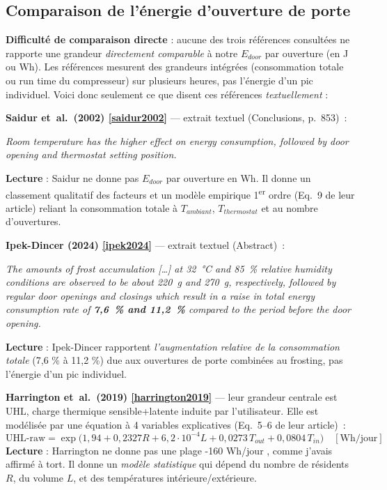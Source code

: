\documentclass[11pt,a4paper]{article}
\begin{document}
\subsection{Comparaison de l'énergie d'ouverture de porte}

\begin{honnete}
\textbf{Difficulté de comparaison directe} : aucune des trois références consultées ne
rapporte une grandeur \emph{directement comparable} à notre $E_{door}$ par ouverture (en
J ou Wh). Les références mesurent des grandeurs intégrées (consommation totale ou run
time du compresseur) sur plusieurs heures, pas l'énergie d'un pic individuel. Voici donc
seulement ce que disent ces références \emph{textuellement} :
\end{honnete}

\textbf{Saidur et~al.\ (2002) \ref{saidur2002}} — extrait textuel (Conclusions, p.~853)~:
\begin{tcolorbox}[breakable,enhanced jigsaw,colback=yellow!10,colframe=yellow!50!black,boxrule=0.4pt,arc=2pt]
\og{} \emph{Room temperature has the higher effect on energy consumption, followed by
door opening and thermostat setting position.} \fg{}
\end{tcolorbox}
\textbf{Lecture} : Saidur ne donne pas $E_{door}$ par ouverture en Wh. Il donne un classement
qualitatif des facteurs et un modèle empirique 1\textsuperscript{er} ordre (Eq.~9 de leur
article) reliant la consommation totale à $T_{ambiant}$, $T_{thermostat}$ et au nombre
d'ouvertures.

\medskip
\textbf{Ipek-Dincer (2024) \ref{ipek2024}} — extrait textuel (Abstract)~:
\begin{tcolorbox}[breakable,enhanced jigsaw,colback=yellow!10,colframe=yellow!50!black,boxrule=0.4pt,arc=2pt]
\og{} \emph{The amounts of frost accumulation [\dots] at 32~°C and 85~\% relative humidity
conditions are observed to be about 220~g and 270~g, respectively, followed by regular
door openings and closings which result in a raise in total energy consumption rate of
\textbf{7,6~\% and 11,2~\%} compared to the period before the door opening.} \fg{}
\end{tcolorbox}
\textbf{Lecture} : Ipek-Dincer rapportent \emph{l'augmentation relative de la consommation
totale} (7,6 \% à 11,2 \%) due aux ouvertures de porte combinées au frosting, pas
l'énergie d'un pic individuel.

\medskip
\textbf{Harrington et~al.\ (2019) \ref{harrington2019}} — leur grandeur centrale est
$\mathrm{UHL}$, charge thermique sensible+latente induite par l'utilisateur. Elle est
modélisée par une équation à 4 variables explicatives (Eq.~5--6 de leur article)~:
\begin{equation}
\mathrm{UHL\text{-}raw} = \exp\!\big(1{,}94 + 0{,}2327 R + 6{,}2\!\cdot\!10^{-4} L + 0{,}0273\,T_{out} + 0{,}0804\,T_{in}\big)\quad[\text{Wh}/\text{jour}]
\end{equation}
\textbf{Lecture} : Harrington ne donne pas une plage -160 Wh/jour \fg{}, comme
j'avais affirmé à tort. Il donne un \emph{modèle statistique} qui dépend du nombre de
résidents $R$, du volume $L$, et des températures intérieure/extérieure.
\end{document}
